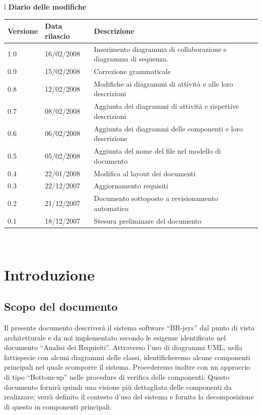 \documentclass[11pt,titlepage,a4paper]{report}
\begin{document}
\begin{center}
\begin{table}[hbtp]
\large{
\begin{tabular}{l}
\Large{\textbf{\textsf{Diario delle modifiche}}} \\
\begin{tabular}{||p{2cm}||p{3cm}||p{5cm}||} \hline
\textbf{Versione} & \textbf{Data rilascio} & \textbf{Descrizione} \\ \hline
1.0 & 16/02/2008 & Inserimento diagramma di collaborazione e diagramma di sequenza. \\ \hline
0.9 & 15/02/2008 & Correzione grammaticale \\ \hline
0.8 & 12/02/2008 & Modifiche ai diagrammi di attivit\`a e alle loro    descrizioni\\ \hline
0.7 & 08/02/2008 & Aggiunta dei diagrammi di attivit\`a e rispettive    descrizioni\\ \hline
0.6 & 06/02/2008 & Aggiunta dei diagrammi delle componenti e loro descrizione\\ \hline
0.5 & 05/02/2008 & Aggiunta del nome del file nel modello di documento\\ \hline
0.4 & 22/01/2008 & Modifica al layout dei documenti\\ \hline
0.3 & 22/12/2007 & Aggiornamento requisiti\\ \hline
0.2 & 21/12/2007 & Documento sottoposto a revisionamento automatico\\ \hline
0.1 & 18/12/2007 & Stesura preliminare del documento \\ \hline

\end{tabular} \\
\end{tabular}

}
\end{table}
\end{center}

\newpage

\tableofcontents


\chapter{Introduzione}
\section{Scopo del documento}
Il presente documento descriver\`a il sistema software ``BR-jsys'' dal punto di vista architetturale e da noi implementato secondo le esigenze identificate nel documento ``Analisi dei Requisiti''. Attraverso l'uso di diagrammi UML, nella fattispecie con alcuni diagrammi delle classi, identificheremo alcune componenti principali nel quale scomporre il sistema. Procederemo inoltre con un approccio di tipo ``Bottom-up'' nelle procedure di verifica delle componenti. Questo documento fornir\`a quindi una visione pi\`u dettagliata delle componenti da realizzare; verr\`a definito il contesto d'uso del sistema e fornita la decomposizione di questo in componenti principali.
\end{document}
